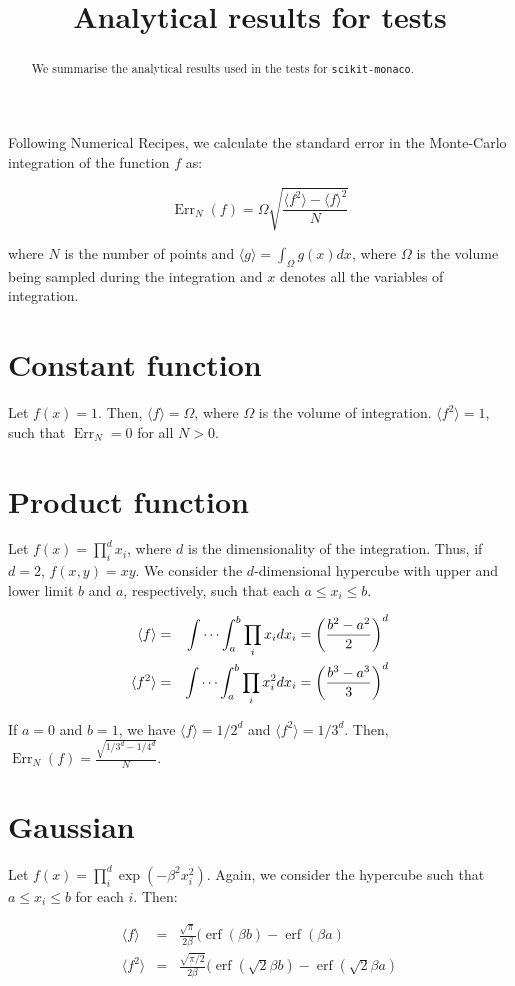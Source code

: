 \documentclass[a4paper]{article}
\title{Analytical results for tests}
\newcommand{\expval}[1]{\langle #1 \rangle}
\DeclareMathOperator{\Err}{Err}
\DeclareMathOperator{\erf}{erf}
\begin{document}
\maketitle

\begin{abstract}
We summarise the analytical results used in the tests for
\verb=scikit-monaco=. 
\end{abstract}


Following Numerical Recipes, we calculate the standard error in the Monte-Carlo
integration of the function $f$ as:

\begin{equation}
    \Err_N(f) = \Omega \sqrt{\frac{\expval{f^2}-\expval{f}^2}{N}}
\end{equation}

where $N$ is the number of points and $\expval{g} = \int_\Omega g(x) dx$, where
$\Omega$ is the volume being sampled during the integration and $x$ denotes all
the variables of integration.


\section{Constant function}

Let $f(x) = 1$. Then, $\expval{f} = \Omega$, where $\Omega$ is the volume of
integration. $\expval{f^2} = 1$, such that $\Err_N = 0$ for all $N > 0$.


\section{Product function}

Let $f(x) = \prod_i^d x_i$, where $d$ is the dimensionality of the
integration. Thus, if $d = 2$, $f(x,y) = xy$. We consider the $d$-dimensional
hypercube with upper and lower limit $b$ and $a$, respectively, such that each
$a \le x_i \le b$. 

\begin{eqnarray}
    \expval{f} &=& \idotsint_a^b \prod_i x_i dx_i =
    \left(\frac{b^2-a^2}{2}\right)^d \\
    \expval{f^2} &=& \idotsint_a^b \prod_i x_i^2 dx_i =
    \left(\frac{b^3-a^3}{3}\right)^d 
\end{eqnarray}

If $a = 0$ and $b=1$, we have $\expval{f} = 1/2^d$ and $\expval{f^2} = 1/3^d$.
Then, $\Err_N(f) = \frac{\sqrt{1/3^d - 1/4^d}}{N}$.


\section{Gaussian}

Let $f(x) = \prod_i^d \exp(-\beta^2 x_i^2)$. Again, we consider the
hypercube such that $a \le x_i \le b$ for each $i$. Then:

\begin{eqnarray}
    \expval{f} &=& \frac{\sqrt{\pi}}{2\beta} (\erf(\beta b) - \erf(\beta a) \\
    \expval{f^2} &=& \frac{\sqrt{\pi/2}}{2\beta} (\erf(\sqrt{2}\beta b) -
    \erf(\sqrt{2}\beta a)
\end{eqnarray}
\end{document}
